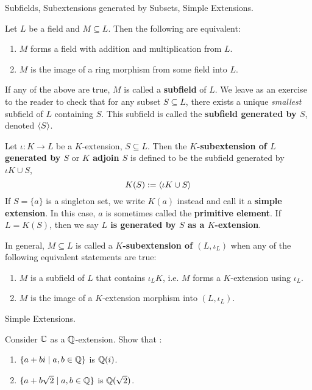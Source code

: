 \documentclass[../book.tex]{subfiles}
\begin{document}
\begin{dfn} Subfields, Subextensions generated by Subsets, Simple Extensions. 

    Let $L$ be a field and $M \subseteq L$.
    Then the following are equivalent: 
    \begin{enumerate}
        \item $M$ forms a field with addition and multiplication from $L$.
        \item $M$ is the image of a ring morphism from some field into $L$. 
    \end{enumerate}
    If any of the above are true, $M$ is called a \textbf{subfield} of $L$. 
    We leave as an exercise to the reader to check that 
    for any subset $S \subseteq L$,
    there exists a unique \emph{smallest} subfield of $L$ containing $S$.
    This subfield is called the \textbf{subfield generated by $S$}, denoted $\langle S\rangle$. 

    Let $\iota : K \to L$ be a $K$-extension, $S \subseteq L$. 
    Then the \textbf{$K$-subextension of $L$ generated by $S$} or 
    \textbf{$K$ adjoin $S$} is defined to be 
    the subfield generated by $\iota K \cup S$, 
    \[ K(S) := \langle \iota K \cup S\rangle \]
    If $S = \{a\}$ is a singleton set, we write $K(a)$ instead
    and call it a \textbf{simple extension}. 
    In this case, $a$ is sometimes called the \textbf{primitive element}. 
    If $L = K(S)$, then we say \textbf{$L$ is generated by $S$ as a $K$-extension}.
    
    In general, $M \subseteq L$ is called a \textbf{$K$-subextension of $(L,\iota_L)$}
    when any of the following equivalent statements are true:
    \begin{enumerate}
        \item $M$ is a subfield of $L$ that contains $\iota_L K$, i.e.
        $M$ forms a $K$-extension using $\iota_L$.  
        \item $M$ is the image of a $K$-extension morphism into $(L,\iota_L)$. 
    \end{enumerate}

\end{dfn}

\begin{ex} Simple Extensions.
    
    Consider $\mathbb{C}$ as a $\mathbb{Q}$-extension.
    Show that : \begin{enumerate}
        \item $\{a + b i \mid a, b \in \mathbb{Q}\}$ is $\mathbb{Q}(i)$.
        \item $\{a + b\sqrt{2} \mid a, b \in \mathbb{Q} \}$ is $\mathbb{Q}(\sqrt{2})$.
    \end{enumerate}
    
\end{ex}
\end{document}
